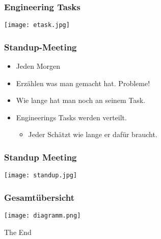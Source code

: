\documentclass[compress, blue]{beamer}
\begin{document}
\begin{frame}\frametitle{Engineering Tasks}
    \texttt{[image: etask.jpg]}
\end{frame}

\begin{frame}\frametitle{Standup-Meeting}
  \begin{itemize}
  \item Jeden Morgen
  \item Erzählen was man gemacht hat. Probleme!
  \item Wie lange hat man noch an seinem Task.
  \item Engineerings Tasks werden verteilt.
    \begin{itemize}
      \item Jeder Schätzt wie lange er dafür braucht.
    \end{itemize}
  \end{itemize}
\end{frame}

\begin{frame}\frametitle{Standup Meeting}
    \texttt{[image: standup.jpg]}
\end{frame}


\begin{frame}\frametitle{Gesamtübersicht}
    \texttt{[image: diagramm.png]}
\end{frame}

\begin{frame}
  The End
\end{frame}
\end{document}
